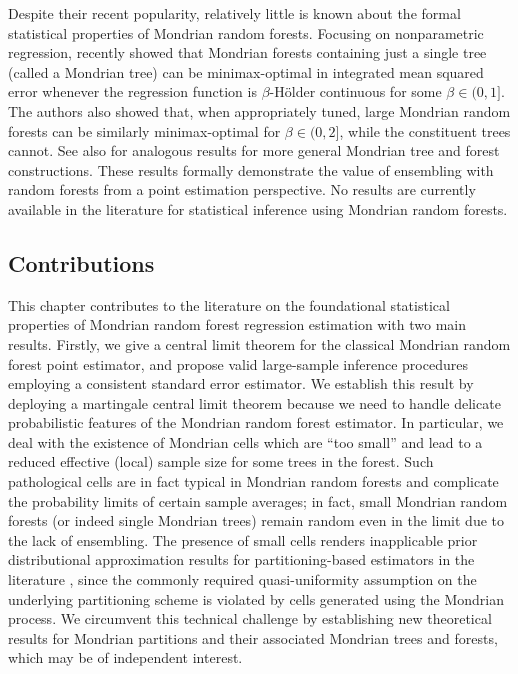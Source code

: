 Despite their recent popularity, relatively little is known about the formal
statistical properties of Mondrian random forests. Focusing on nonparametric
regression, \citet{mourtada2020minimax} recently showed that Mondrian forests
containing just a single tree (called a Mondrian tree) can be minimax-optimal
in integrated mean squared error whenever the regression function is
$\beta$-H{\"o}lder continuous for some $\beta \in (0, 1]$. The authors also
showed that, when appropriately tuned, large Mondrian random forests can be
similarly minimax-optimal for $\beta \in (0, 2]$, while the constituent trees
cannot. See also \citet{oreilly2022stochastic} for analogous results for more
general
Mondrian tree and forest constructions. These results formally demonstrate the
value of ensembling with random forests from a point estimation perspective. No
results are currently available in the literature for statistical inference
using Mondrian random forests.

\subsection{Contributions}

This chapter contributes to the literature on the foundational statistical
properties of Mondrian random forest regression estimation with two main
results. Firstly, we give a central limit theorem for the classical Mondrian
random forest point estimator, and propose valid large-sample inference
procedures employing a consistent standard error estimator. We establish this
result by deploying a martingale central limit theorem
\citep[Theorem~3.2]{hall1980martingale} because we need to handle delicate
probabilistic features of the Mondrian random forest estimator. In particular,
we deal with the existence of Mondrian cells which are ``too small'' and lead
to a reduced effective (local) sample size for some trees in the forest. Such
pathological cells are in fact typical in Mondrian random forests and
complicate the probability limits of certain sample averages; in fact, small
Mondrian random forests (or indeed single Mondrian trees) remain random even
in the limit due to the lack of ensembling. The presence of small cells
renders inapplicable prior distributional approximation results for
partitioning-based estimators in the literature
\citep{huang2003local,cattaneo2020large}, since the commonly required
quasi-uniformity assumption on the underlying partitioning scheme is violated
by cells generated using the Mondrian process. We circumvent this
technical challenge by establishing new theoretical results for Mondrian
partitions and their associated Mondrian trees and forests, which may be of
independent interest.


